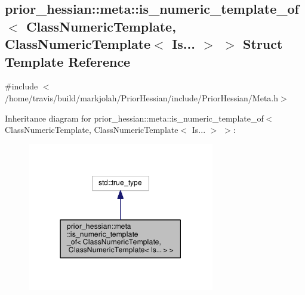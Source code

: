 \hypertarget{structprior__hessian_1_1meta_1_1is__numeric__template__of_3_01ClassNumericTemplate_00_01ClassNum9ff24e61e3d3187d075a4a72dee66cb3}{}\subsection{prior\+\_\+hessian\+:\+:meta\+:\+:is\+\_\+numeric\+\_\+template\+\_\+of$<$ Class\+Numeric\+Template, Class\+Numeric\+Template$<$ Is... $>$ $>$ Struct Template Reference}
\label{structprior__hessian_1_1meta_1_1is__numeric__template__of_3_01ClassNumericTemplate_00_01ClassNum9ff24e61e3d3187d075a4a72dee66cb3}


{\ttfamily \#include $<$/home/travis/build/markjolah/\+Prior\+Hessian/include/\+Prior\+Hessian/\+Meta.\+h$>$}



Inheritance diagram for prior\+\_\+hessian\+:\+:meta\+:\+:is\+\_\+numeric\+\_\+template\+\_\+of$<$ Class\+Numeric\+Template, Class\+Numeric\+Template$<$ Is... $>$ $>$\+:\nopagebreak
\begin{figure}[H]
\begin{center}
\leavevmode
\includegraphics[width=231pt]{structprior__hessian_1_1meta_1_1is__numeric__template__of_3_01ClassNumericTemplate_00_01ClassNum8591caa6d39cb573d95ef96fbc0cbf3a}
\end{center}
\end{figure}


